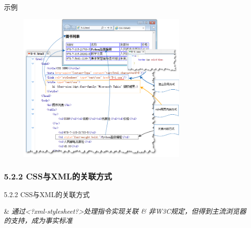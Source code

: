 \begin{frame}[fragile]{示例}
\begin{figure}
    \includegraphics[width=0.75\textwidth]{figure/css-html-association.png}
\end{figure}
\end{frame}


\subsubsection{5.2.2 CSS与XML的关联方式}
\begin{frame}[fragile]{5.2.2 CSS与XML的关联方式}
\begin{easylist} \easyitem
& \em{通过<?xml-stylesheet?>处理指令实现关联}
& 非W3C规定，但得到主流浏览器的支持，成为事实标准
\end{easylist}
\end{frame}



